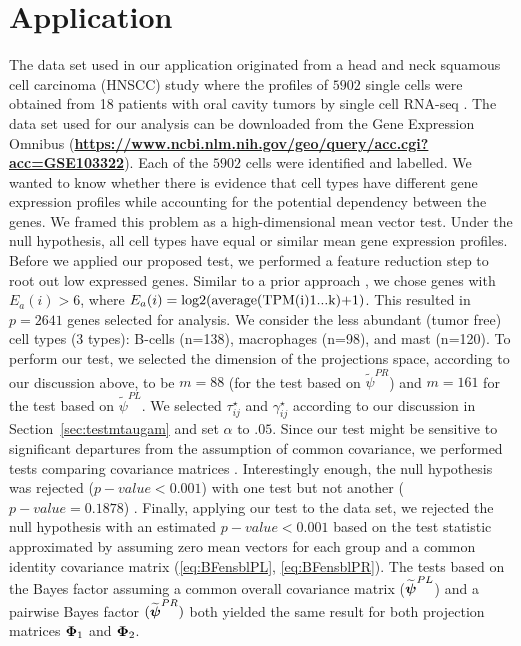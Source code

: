 \documentclass[times,sort&compress,3p]{elsarticle}
\theoremstyle{plain}%
\theoremstyle{definition}
\def\log{\hbox{log}}
\def\log{\hbox{log}}
\def\boldpsi{{\mbox{\boldmath $\psi$}}}
\newcommand{\uPhi}              {\mbox{\boldmath$\Phi$}}
\begin{document}
\section{Application} \label{sec:Application}
The data set used in our application originated from a head and neck squamous cell carcinoma (HNSCC) study where the profiles of $5902$ single cells were obtained from 18 patients with oral cavity tumors by single cell RNA-seq \cite{puram2017single}. The data set used for our analysis can be downloaded from the Gene Expression Omnibus (\textbf{\url{https://www.ncbi.nlm.nih.gov/geo/query/acc.cgi?acc=GSE103322}}). Each of the $5902$ cells were identified and labelled. %
We wanted to know whether there is evidence that cell types have different gene expression profiles while accounting for the potential dependency between the genes. We framed this problem as a high-dimensional mean vector test. Under the null hypothesis, all cell types have equal or similar mean gene expression profiles. Before we applied our proposed test, we performed a feature reduction step to root out low expressed genes. Similar to a prior approach \cite{puram2017single}, we chose genes with $E_a(i) > 6$, where $E_a(i)=\log2\text{(average(TPM(i)1...k)+1)}$. This resulted in $p = 2641$ genes selected for analysis. We consider the less abundant (tumor free) cell types (3 types): B-cells (n=138), macrophages (n=98), and mast (n=120). To perform our test, we selected the dimension of the projections space, according to our discussion above, to be $m = 88$ (for the test based on $\widetilde{\psi}^{PR}$) and $m = 161$ for the test based on $\widetilde{\psi}^{PL}$. We selected $\tau^{\star}_{ij}$ and $\gamma^{\star}_{ij}$ according to our discussion in Section~\ref{sec:testmtaugam} and set $\alpha$ to $.05$. Since our test might be sensitive to significant departures from the assumption of common covariance, we performed tests comparing covariance matrices \cite{ahmad2017location,srivastava2010testing}. Interestingly enough, the null hypothesis was rejected ($p-value < 0.001$) with one test \cite{ahmad2017location} but not another ($p-value = 0.1878$) \cite{srivastava2010testing}. 
Finally, applying our test to the data set, we rejected the null hypothesis with an estimated $p-value < 0.001$ based on the test statistic approximated by assuming zero mean vectors for each group and a common identity covariance matrix (\ref{eq:BFensblPL}, \ref{eq:BFensblPR}). The tests based on the Bayes factor assuming a common overall covariance matrix ($\widetilde{\boldpsi}^{PL}$) and a pairwise Bayes factor $(\widetilde{\boldpsi}^{PR})$ both yielded the same result for both projection matrices $\uPhi_1$ and $\uPhi_2$. 
\end{document}
